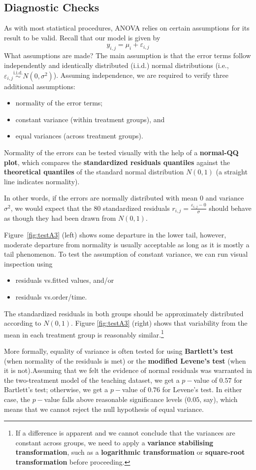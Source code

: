 \subsection{Diagnostic Checks}
As with most statistical procedures, ANOVA relies on certain assumptions for its result to be valid. Recall that our model is given by
$$
    y_{i,j}=\mu_{i}+\varepsilon_{i,j}
$$
What assumptions are made? The main assumption is that the error terms follow independently and identically distributed ({i.i.d.}) normal distributions (i.e., $\varepsilon_{i,j}\stackrel{\text{i.i.d.}}{\sim}N(0,\sigma^{2})$). \newpage\noindent Assuming independence, we are required to verify three additional assumptions:
\begin{itemize}[noitemsep]
    \item normality of the error terms;
    \item constant variance (within treatment groups), and
    \item equal variances (across treatment groups).
\end{itemize}
Normality of the errors can be tested visually with the help of a \textbf{normal-QQ plot}, which compares the \textbf{standardized residuals quantiles} against the \textbf{theoretical quantiles} of the standard normal distribution $N(0,1)$ (a straight line indicates normality).\par In other words, if the errors are normally distributed with mean $0$ and variance $\sigma^2$, we would expect that the $80$ standardized residuals $r_{i,j}=\frac{\varepsilon_{i,j}-0}{\sigma}$ should behave as though they had been drawn from $N(0,1)$.\par  Figure~\ref{fig:testA3} (left) shows some departure in the lower tail, however, moderate departure from normality is usually acceptable as long as it is mostly a tail phenomenon.
\newl To test the assumption of constant variance, we can run visual inspection using  \begin{itemize} [noitemsep]
\item residuals vs.\@ fitted values, and/or 
\item residuals vs.\@ order/time. 
\end{itemize}
The standardized residuals in both groups should be approximately distributed according to $N(0,1)$. Figure \ref{fig:testA3} (right) shows that variability from the mean in each treatment group is reasonably similar.\footnote{If a difference is apparent and we cannot conclude that the variances are constant across groups, we need to apply a \textbf{variance stabilising transformation}, such as a \textbf{logarithmic transformation} or \textbf{square-root transformation} before proceeding.} \par More formally, equality of variance is often tested for using \textbf{Bartlett's test} (when normality of the residuals is met) or the \textbf{modified Levene's test} (when it is not).\newl Assuming that we felt the evidence of normal residuals was warranted in the two-treatment model of the teaching dataset, we get a $p-$value of $0.57$ for Bartlett's test; otherwise, we get a $p-$value  of $0.76$ for Levene's test. In either case, the $p-$value falls above reasonable significance levels ($0.05$, say), which means that we cannot reject the null hypothesis of equal variance. 
